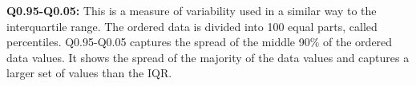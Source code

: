 \textbf{Q0.95-Q0.05:} This is a measure of variability used in a similar
way to the interquartile range.
The ordered data is divided into 100 equal parts, called percentiles. Q0.95-Q0.05 captures the
spread of the middle 90\% of the ordered data values. It shows the spread
of the majority of the data values and captures a larger set of values than the IQR.



